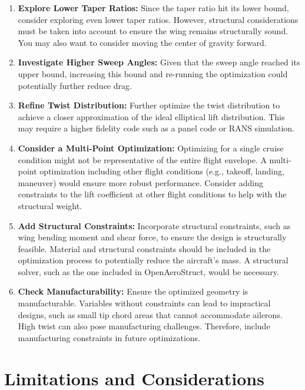 \documentclass{article}
\begin{document}
\begin{enumerate}
    \item \textbf{Explore Lower Taper Ratios:} Since the taper ratio hit its lower bound, consider exploring even lower taper ratios. However, structural considerations must be taken into account to ensure the wing remains structurally sound. You may also want to consider moving the center of gravity forward.
    \item \textbf{Investigate Higher Sweep Angles:} Given that the sweep angle reached its upper bound, increasing this bound and re-running the optimization could potentially further reduce drag.
    \item \textbf{Refine Twist Distribution:} Further optimize the twist distribution to achieve a closer approximation of the ideal elliptical lift distribution. This may require a higher fidelity code such as a panel code or RANS simulation.
    \item \textbf{Consider a Multi-Point Optimization:} Optimizing for a single cruise condition might not be representative of the entire flight envelope. A multi-point optimization including other flight conditions (e.g., takeoff, landing, maneuver) would ensure more robust performance. Consider adding constraints to the lift coefficient at other flight conditions to help with the structural weight.
    \item \textbf{Add Structural Constraints:} Incorporate structural constraints, such as wing bending moment and shear force, to ensure the design is structurally feasible. Material and structural constraints should be included in the optimization process to potentially reduce the aircraft's mass. A structural solver, such as the one included in OpenAeroStruct, would be necessary.
    \item \textbf{Check Manufacturability:} Ensure the optimized geometry is manufacturable. Variables without constraints can lead to impractical designs, such as small tip chord areas that cannot accommodate ailerons. High twist can also pose manufacturing challenges. Therefore, include manufacturing constraints in future optimizations.
\end{enumerate}

\section{Limitations and Considerations}
\end{document}
